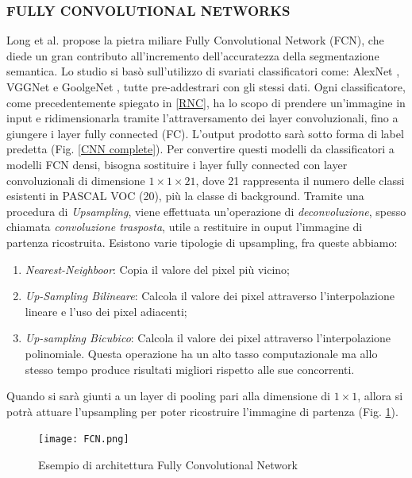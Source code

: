 \subsubsection{FULLY CONVOLUTIONAL NETWORKS}
Long et al. \cite{fcn} propose la pietra miliare Fully Convolutional Network (FCN), 
che diede un gran contributo all'incremento dell'accuratezza della segmentazione 
semantica. Lo studio si basò sull'utilizzo di svariati classificatori 
come: AlexNet \cite{alexnet}, VGGNet\cite{vggNet} e GoolgeNet \cite{googleNet}, tutte pre-addestrari 
con gli stessi dati. Ogni classificatore, come precedentemente spiegato 
in \ref{RNC}, ha lo scopo di prendere un'immagine in input e ridimensionarla 
tramite l'attraversamento dei layer convoluzionali, fino a giungere i layer 
fully connected (FC). L'output prodotto sarà sotto forma di label predetta 
(Fig. \ref{CNN complete}). Per convertire questi modelli da classificatori a modelli FCN 
densi, bisogna sostituire i layer fully connected con layer convoluzionali di 
dimensione $1 \times 1 \times 21$, dove 21 rappresenta il numero delle classi esistenti 
in PASCAL VOC (20), più la classe di background. Tramite una procedura 
di \emph{Upsampling}, viene effettuata un'operazione di \emph{deconvoluzione}, spesso 
chiamata \emph{convoluzione trasposta}, utile a restituire in ouput l'immagine di 
partenza ricostruita. Esistono varie tipologie di upsampling, fra queste 
abbiamo:
\begin{enumerate}
    \item \emph{Nearest-Neighboor}: Copia il valore del pixel più vicino;
    \item \emph{Up-Sampling Bilineare}: Calcola il valore dei pixel attraverso l'interpolazione 
    lineare e l'uso dei pixel adiacenti;
    \item \emph{Up-sampling Bicubico}: Calcola il valore dei pixel attraverso l'interpolazione 
    polinomiale. Questa operazione ha un alto tasso computazionale 
    ma allo stesso tempo produce risultati migliori rispetto alle sue 
    concorrenti. 
\end{enumerate}
Quando si sarà giunti a un layer di pooling pari alla dimensione di $1 \times 1$, 
allora si potrà attuare l'upsampling per poter ricostruire l'immagine di 
partenza (Fig. \ref{FCN}). 
\begin{figure}
    \centering
    \texttt{[image: FCN.png]}
    \centering
    \caption{Esempio di architettura Fully Convolutional Network}
    \label{FCN}
\end{figure}
